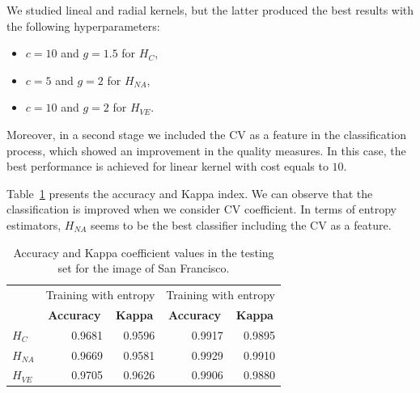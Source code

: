 \documentclass[journal]{IEEEtran}
\begin{document}


We studied lineal and radial kernels, but the latter produced the best results with the following hyperparameters:
\begin{itemize}
    \item $c=10$ and $g=1.5$ for $H_C$,
    \item $c=5$ and $g=2$ for $H_{NA}$,
    \item $c=10$ and $g=2$ for $H_{VE}$.
\end{itemize}

Moreover, in a second stage we included the CV as a feature in the classification process, which showed an improvement in the quality measures. In this case, the best performance is achieved for linear kernel with cost equals to $10$.

Table~\ref{tab:acc_SF} presents the accuracy and Kappa index. 
We can observe that the classification is improved when we consider CV coefficient. In terms of entropy estimators, $H_{NA}$ seems to be the best classifier including the CV as a feature.

\begin{table}[htbp]
  \centering
  \caption{Accuracy and Kappa coefficient values in the testing set for the image of San Francisco.}
    \begin{tabular}{lrrrr}
          & \multicolumn{2}{c}{\multirow{2}[-2]{*}{Training with entropy}} & \multicolumn{2}{c}{\multirow{2}[-2]{*}{Training with entropy}} \\
          & \multicolumn{2}{c}{estimators} & \multicolumn{2}{c}{estimators and cv} \\
\cmidrule{2-5}          & \multicolumn{1}{c}{\textbf{Accuracy}} & \multicolumn{1}{c}{\textbf{Kappa}} & \multicolumn{1}{c}{\textbf{Accuracy}} & \multicolumn{1}{c}{\textbf{Kappa}} \\
    \midrule
    $H_C$    & 0.9681 & 0.9596 & 0.9917 & 0.9895 \\
    $H_{NA}$   & 0.9669 & 0.9581 & 0.9929 & 0.9910 \\
    $H_{VE}$   & 0.9705 & 0.9626 & 0.9906 & 0.9880 \\
    \bottomrule
    \end{tabular}%
  \label{tab:acc_SF}%
\end{table}%
\end{document}
